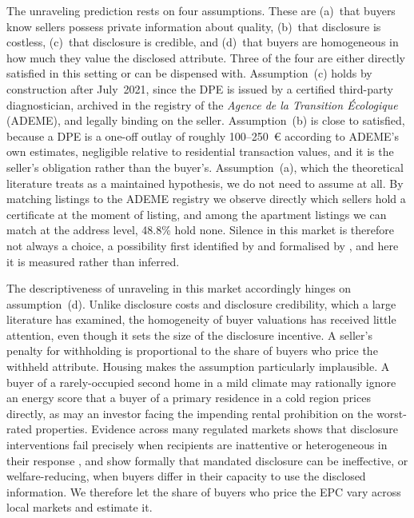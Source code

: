 The unraveling prediction rests on four assumptions. These are (a)~that buyers know sellers
possess private information about quality, (b)~that disclosure is costless, (c)~that disclosure is
credible, and (d)~that buyers are homogeneous in how much they value the disclosed attribute. Three of the four are
either directly satisfied in this setting or can be dispensed with. Assumption~(c) holds by
construction after July~2021, since the DPE is issued by a certified third-party diagnostician,
archived in the registry of the \emph{Agence de la Transition \'Ecologique} (ADEME), and legally
binding on the seller. Assumption~(b) is close to satisfied, because a DPE is a one-off outlay of
roughly 100--250~\euro{} according to ADEME's own estimates, negligible relative to
residential transaction values, and it is the seller's obligation rather than the buyer's.
Assumption~(a), which the theoretical literature treats as a maintained hypothesis, we do not
need to assume at all. By matching listings to the ADEME registry we observe directly which
sellers hold a certificate at the moment of listing, and among the apartment listings we can
match at the address level, 48.8\% hold none.
Silence in this market is therefore not always a choice, a possibility first identified by
\citet{dye_disclosure_1985} and formalised by \citet{jung_kwon_1988}, and here it is measured
rather than inferred.

The descriptiveness of unraveling in this market accordingly hinges on assumption~(d).
Unlike disclosure costs and disclosure credibility, which a large literature has examined,
the homogeneity of buyer valuations has received little attention, even though it sets the size of
the disclosure incentive. A seller's penalty for withholding is proportional to the share of
buyers who price the withheld attribute. Housing makes the
assumption particularly implausible. A buyer of a rarely-occupied second home in a mild climate
may rationally ignore an energy score that a buyer of a primary residence in a cold region
prices directly, as may an investor facing the impending rental prohibition on the worst-rated
properties. Evidence across many regulated markets shows that disclosure interventions fail
precisely when recipients are inattentive or heterogeneous in their response
\citep{loewenstein_disclosure_2014, benshahar_failure_2011}, and
\citet{fishman_mandatory_2003} show formally that mandated disclosure can be ineffective, or
welfare-reducing, when buyers differ in their capacity to use the disclosed information. We
therefore let the share of buyers who price the EPC vary across local markets and estimate it.

